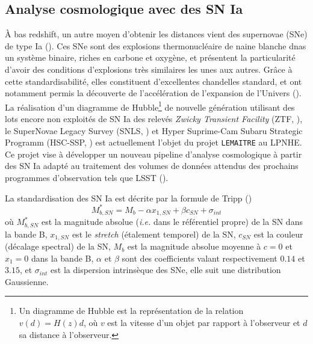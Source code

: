 \documentclass{book}
\def\lemaitre{\texttt{LEMAITRE}\xspace}
\begin{document}
\subsection{Analyse cosmologique avec des SN Ia}

À bas redshift, un autre moyen d'obtenir les distances vient des supernovae (SNe) de type Ia (\cite{hoyle_nucleosynthesis_1960}). Ces SNe sont des explosions thermonucléaire de naine blanche dnas un système binaire, riches en carbone et oxygène, et présentent la particularité d’avoir des conditions d'explosions très similaires les unes aux autres. Grâce à cette standardisabilité, elles constituent d'excellentes chandelles standard, et ont notamment permis la découverte de l'accélération de l'expansion de l'Univers (\cite{perlmutter_cosmology_1998, riess_observational_1998}). La réalisation d'un diagramme de Hubble\footnote{Un diagramme de Hubble est la représentation de la relation $v(d)=H(z) d$, où $v$ est la vitesse d'un objet par rapport à l'observeur et $d$ sa distance à l'observeur.} de nouvelle génération utilisant des lots encore non exploités de SN Ia des relevés \textit{Zwicky Transient Facility} (ZTF, \cite{bellm_zwicky_2018}), le SuperNovae Legacy Survey (SNLS, \cite{pritchet_snls_2004}) et Hyper Suprime-Cam Subaru Strategic Programm (HSC-SSP, \cite{miyazaki_hyper_2012,aihara_hyper_2018}) est actuellement l’objet du projet \lemaitre au LPNHE. Ce projet vise à développer un nouveau pipeline d'analyse cosmologique à partir des SN Ia adapté au traitement des volumes de données attendus des prochains programmes d’observation tels que LSST (\cite{the_lsst_dark_energy_science_collaboration_lsst_2021}).

La standardisation des SN Ia est décrite par la formule de Tripp (\cite{tripp_two-parameter_1998})
\begin{equation}
\label{eq:tripp}
    M^*_{b,SN} = M_b - \alpha x_{1,SN} + \beta c_{SN} + \sigma_{int}
\end{equation}
où $M^*_{b,SN}$ est la magnitude absolue (\textit{i.e.} dans le référentiel propre) de la SN dans la bande B, $x_{1,SN}$ est le \textit{stretch} (étalement temporel) de la SN, $c_{SN}$ est la couleur (décalage spectral) de la SN, $M_b$ est la magnitude absolue moyenne à $c=0$ et $x_1=0$ dans la bande B, $\alpha$ et $\beta$ sont des coefficients valant respectivement $0.14$ et $3.15$, et $\sigma_{int}$ est la dispersion intrinsèque des SNe, elle suit une distribution Gaussienne.
\end{document}
